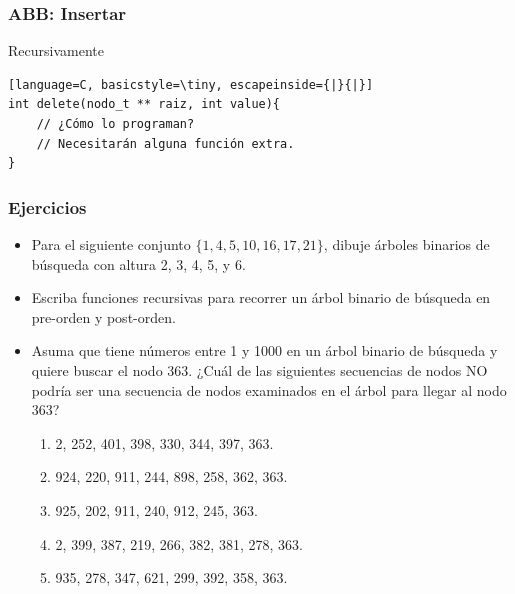 \documentclass{beamer}
\begin{document}
\begin{frame}[fragile]
 \frametitle{ABB: Insertar}
\begin{exampleblock}{Recursivamente}
\begin{lstlisting}[language=C, basicstyle=\tiny, escapeinside={|}{|}]
int delete(nodo_t ** raiz, int value){ 
	// ¿Cómo lo programan?
	// Necesitarán alguna función extra.
}
\end{lstlisting}
\end{exampleblock}
\end{frame}

\begin{frame}[fragile]
 \frametitle{Ejercicios}
\begin{itemize}
\item Para el siguiente conjunto $\{1, 4, 5, 10, 16, 17, 21\}$, dibuje árboles binarios de búsqueda con altura 2, 3, 4, 5, y 6.
\item Escriba funciones recursivas para recorrer un árbol binario de búsqueda en pre-orden y post-orden.
\item Asuma que tiene números entre 1 y 1000 en un árbol binario de búsqueda y quiere buscar el nodo 363. ¿Cuál de las siguientes secuencias de nodos NO podría ser una secuencia de nodos examinados en el árbol para llegar al nodo 363?
\begin{enumerate}
\item 2, 252, 401, 398, 330, 344, 397, 363.
\item 924, 220, 911, 244, 898, 258, 362, 363.
\item 925, 202, 911, 240, 912, 245, 363.
\item 2, 399, 387, 219, 266, 382, 381, 278, 363.
\item 935, 278, 347, 621, 299, 392, 358, 363.
\end{enumerate}
\end{itemize}
\end{frame}
\end{document}
